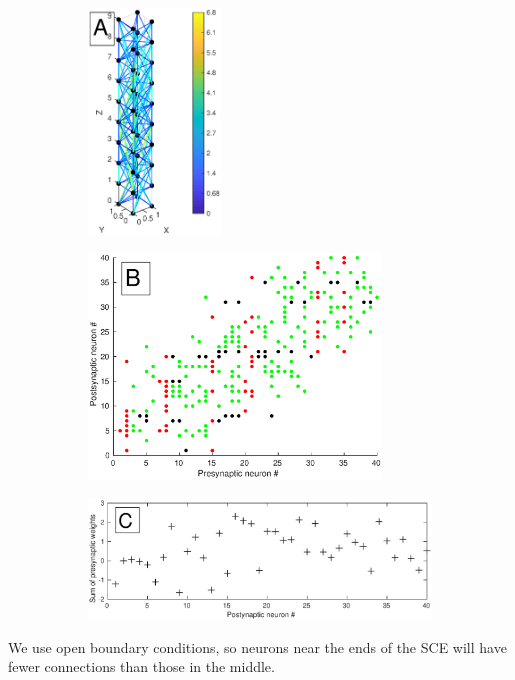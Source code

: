 \documentclass[12pt]{article}
\begin{document}
\begin{figure}[!htb]
 \caption{Example SCE with dimensions 2x2x10 (XxYxZ), $\lambda$=2.5, and C=1. A)  SCE showing connections between neurons as lines colored using a color scale that indicates the connection length. 
 B)  Connection matrix. E-E connections are green, E-I are black and both I-E and I-I  are red. 
 The labels of the neurons used in both axes are sequentially assigned starting at the bottom (Z=0).
 C) The sum of presynaptic weights for each neuron shows the anisotropy of this model, with substantial variation in input strength and sign between the neuron inputs.}
 \label{fig:column_structure}
 \begin{subfigure}{0.3\textwidth}
   \centering
   \includegraphics[height=60mm]{fig/column_structure_A}
 \end{subfigure}%
 \hfill
 \begin{subfigure}{0.7\textwidth}
   \centering
   \includegraphics[height=60mm]{fig/column_structure_B}
 \end{subfigure}%
 \hfill
 
  \begin{subfigure}{\textwidth}
   \centering
   \includegraphics[width=\textwidth]{fig/column_structure_C}
 \end{subfigure}%
\end{figure}
We use open boundary conditions, so neurons near the ends of the SCE will have fewer connections than those in the middle. 
\end{document}
